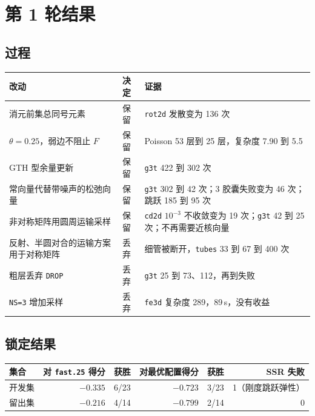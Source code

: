 \documentclass[11pt,a4paper]{ctexart}
\begin{document}
\section{第 1 轮结果}
\subsection{过程}
\begin{table}[H]
\centering\footnotesize
\begin{tabular}{p{7.0cm}p{1.1cm}p{7.2cm}}
\toprule
改动 & 决定 & 证据 \\
\midrule
消元前集总同号元素 & 保留 & \texttt{rot2d} 发散变为 136 次 \\
$\theta=0.25$，弱边不阻止 $F$ & 保留 & Poisson 53 层到 25 层，复杂度 7.90 到 5.5 \\
GTH 型余量更新 & 保留 & \texttt{g3t} 422 到 302 次 \\
常向量代替带噪声的松弛向量 & 保留 & \texttt{g3t} 302 到 42 次；3 胶囊失败变为 46 次；跳跃 185 到 95 次 \\
非对称矩阵用圆周运输采样 & 保留 & \texttt{cd2d} $10^{-3}$ 不收敛变为 19 次；\texttt{g3t} 42 到 25 次；不再需要近核向量 \\
反射、半圆对合的运输方案用于对称矩阵 & 丢弃 & 细管被断开，\texttt{tubes} 33 到 67 到 400 次 \\
粗层丢弃 \texttt{DROP} & 丢弃 & \texttt{g3t} 25 到 73、112，再到失败 \\
\texttt{NS=3} 增加采样 & 丢弃 & \texttt{fe3d} 复杂度 289，89\,s，没有收益 \\
\bottomrule
\end{tabular}
\end{table}

\subsection{锁定结果}
\begin{table}[H]
\centering\footnotesize
\begin{tabular}{lrrrrr}
\toprule
集合 & 对 \texttt{fast.25} 得分 & 获胜 & 对最优配置得分 & 获胜 & SSR 失败 \\
\midrule
开发集 & $-0.335$ & 6/23 & $-0.723$ & 3/23 & 1（刚度跳跃弹性）\\
留出集 & $-0.216$ & 4/14 & $-0.799$ & 2/14 & 0 \\
\bottomrule
\end{tabular}
\end{table}
\end{document}
